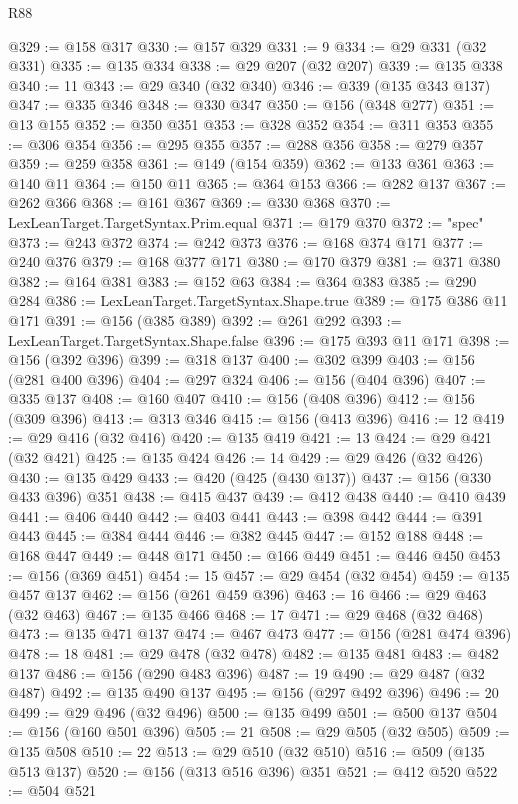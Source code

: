 \begin{lexlean}{R88}
\begin{coremodule}
@329 := @158 @317
@330 := @157 @329
@331 := 9
@334 := @29 @331 (@32 @331)
@335 := @135 @334
@338 := @29 @207 (@32 @207)
@339 := @135 @338
@340 := 11
@343 := @29 @340 (@32 @340)
@346 := @339 (@135 @343 @137)
@347 := @335 @346
@348 := @330 @347
@350 := @156 (@348 @277)
@351 := @13 @155
@352 := @350 @351
@353 := @328 @352
@354 := @311 @353
@355 := @306 @354
@356 := @295 @355
@357 := @288 @356
@358 := @279 @357
@359 := @259 @358
@361 := @149 (@154 @359)
@362 := @133 @361
@363 := @140 @11
@364 := @150 @11
@365 := @364 @153
@366 := @282 @137
@367 := @262 @366
@368 := @161 @367
@369 := @330 @368
@370 := LexLeanTarget.TargetSyntax.Prim.equal
@371 := @179 @370
@372 := "spec"
@373 := @243 @372
@374 := @242 @373
@376 := @168 @374 @171
@377 := @240 @376
@379 := @168 @377 @171
@380 := @170 @379
@381 := @371 @380
@382 := @164 @381
@383 := @152 @63
@384 := @364 @383
@385 := @290 @284
@386 := LexLeanTarget.TargetSyntax.Shape.true
@389 := @175 @386 @11 @171
@391 := @156 (@385 @389)
@392 := @261 @292
@393 := LexLeanTarget.TargetSyntax.Shape.false
@396 := @175 @393 @11 @171
@398 := @156 (@392 @396)
@399 := @318 @137
@400 := @302 @399
@403 := @156 (@281 @400 @396)
@404 := @297 @324
@406 := @156 (@404 @396)
@407 := @335 @137
@408 := @160 @407
@410 := @156 (@408 @396)
@412 := @156 (@309 @396)
@413 := @313 @346
@415 := @156 (@413 @396)
@416 := 12
@419 := @29 @416 (@32 @416)
@420 := @135 @419
@421 := 13
@424 := @29 @421 (@32 @421)
@425 := @135 @424
@426 := 14
@429 := @29 @426 (@32 @426)
@430 := @135 @429
@433 := @420 (@425 (@430 @137))
@437 := @156 (@330 @433 @396) @351
@438 := @415 @437
@439 := @412 @438
@440 := @410 @439
@441 := @406 @440
@442 := @403 @441
@443 := @398 @442
@444 := @391 @443
@445 := @384 @444
@446 := @382 @445
@447 := @152 @188
@448 := @168 @447
@449 := @448 @171
@450 := @166 @449
@451 := @446 @450
@453 := @156 (@369 @451)
@454 := 15
@457 := @29 @454 (@32 @454)
@459 := @135 @457 @137
@462 := @156 (@261 @459 @396)
@463 := 16
@466 := @29 @463 (@32 @463)
@467 := @135 @466
@468 := 17
@471 := @29 @468 (@32 @468)
@473 := @135 @471 @137
@474 := @467 @473
@477 := @156 (@281 @474 @396)
@478 := 18
@481 := @29 @478 (@32 @478)
@482 := @135 @481
@483 := @482 @137
@486 := @156 (@290 @483 @396)
@487 := 19
@490 := @29 @487 (@32 @487)
@492 := @135 @490 @137
@495 := @156 (@297 @492 @396)
@496 := 20
@499 := @29 @496 (@32 @496)
@500 := @135 @499
@501 := @500 @137
@504 := @156 (@160 @501 @396)
@505 := 21
@508 := @29 @505 (@32 @505)
@509 := @135 @508
@510 := 22
@513 := @29 @510 (@32 @510)
@516 := @509 (@135 @513 @137)
@520 := @156 (@313 @516 @396) @351
@521 := @412 @520
@522 := @504 @521

\end{coremodule}
\end{lexlean}
